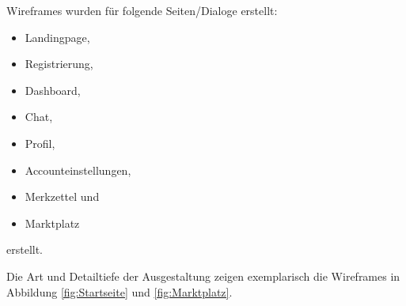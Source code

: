 Wireframes wurden für folgende Seiten/Dialoge erstellt:

\begin{itemize}
    \item Landingpage,
    \item Registrierung,
    \item Dashboard,
    \item Chat,
    \item Profil,
    \item Accounteinstellungen,
    \item Merkzettel und
    \item Marktplatz
\end{itemize}

erstellt.

Die Art und Detailtiefe der Ausgestaltung zeigen exemplarisch die Wireframes in Abbildung \ref{fig:Startseite} und \ref{fig:Marktplatz}.

